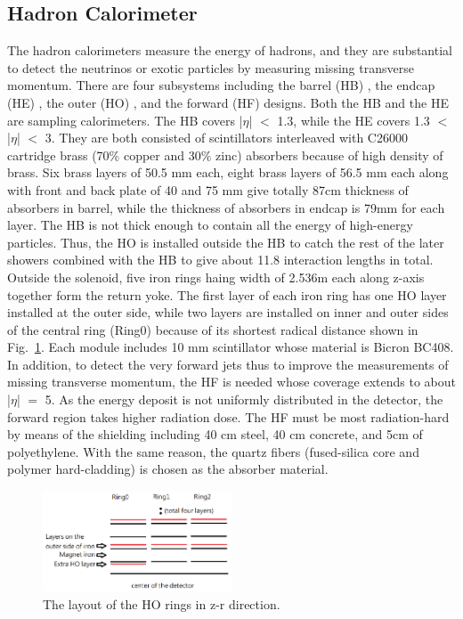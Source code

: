 \subsection{Hadron Calorimeter} 
The hadron calorimeters measure the energy of hadrons, and they are substantial to detect the neutrinos or exotic particles by measuring missing transverse momentum.
There are four subsystems including the barrel (HB) , the endcap (HE) , the outer (HO) , and the forward (HF) designs.
Both the HB and the HE are sampling calorimeters. 
The HB covers |$\eta $| $<$ 1.3, while the HE covers 1.3 $<$ |$\eta $| $<$ 3.
They are both consisted of scintillators interleaved with C26000 cartridge brass (70$\% $ copper and 30$\% $ zinc) absorbers because of high density of brass.
Six brass layers of 50.5 mm each, eight brass layers of 56.5 mm each along with front and back plate of 40 and 75 mm give totally 87cm thickness of absorbers in barrel, while the thickness of absorbers in endcap is 79mm for each layer.
The HB is not thick enough to contain all the energy of high-energy particles.
Thus, the HO is installed outside the HB to catch the rest of the later showers combined with the HB to give about 11.8 interaction lengths in total. Outside the solenoid, five iron rings haing width of 2.536m each along z-axis together form the return yoke. The first layer of each iron ring has one HO layer installed at the outer side, while two layers are installed on inner and outer sides of the central ring (Ring0) because of its shortest radical distance shown in Fig.~\ref{fig:22}. Each module includes 10 mm scintillator whose material is Bicron BC408.
In addition, to detect the very forward jets thus to improve the measurements of missing transverse momentum, the HF is needed whose coverage extends to about |$\eta $| $=$ 5.
As the energy deposit is not uniformly distributed in the detector, the forward region takes higher radiation dose.
The HF must be most radiation-hard by means of the shielding including 40 cm steel, 40 cm concrete, and 5cm of polyethylene. With the same reason, the quartz fibers (fused-silica core and polymer hard-cladding) is chosen as the absorber material.

\begin{figure}[t]
  \begin{center}

    \includegraphics[width=0.5\textwidth]{Figures/20289635_1397863916957915_543326343_n.png} 
    \end{center}
  \caption{The layout of the HO rings in z-r direction.}
  \label{fig:22}
\end{figure}

